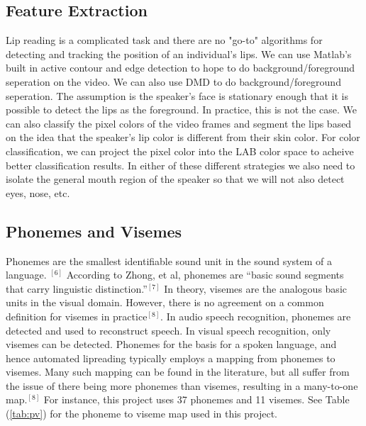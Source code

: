 \documentclass[a4paper]{article}
\begin{document}
\subsection{Feature Extraction}
Lip reading is a complicated task and there are no "go-to" algorithms for detecting and tracking the position of an individual's lips. We can use Matlab's built in active contour and edge detection to hope to do background/foreground seperation on the video. We can also use DMD to do background/foreground seperation. The assumption is the speaker's face is stationary enough that it is possible to detect the lips as the foreground. In practice, this is not the case. We can also classify the pixel colors of the video frames and segment the lips based on the idea that the speaker's lip color is different from their skin color. For color classification, we can project the pixel color into the LAB color space to acheive better classification results. In either of these different strategies we also need to isolate the general mouth region of the speaker so that we will not also detect eyes, nose, etc.
\subsection{Phonemes and Visemes}
Phonemes are the smallest identifiable sound unit in the sound system of a language. $^{[6]}$  According to Zhong, et al, phonemes are ``basic sound segments that carry linguistic distinction.''$^{[7]}$ In theory, visemes are the analogous basic units in the visual domain.  However, there is no agreement on a common definition for visemes in practice$^{[8]}$.  In audio speech recognition, phonemes are detected and used to reconstruct speech.  In visual speech recognition, only visemes can be detected.  Phonemes for the basis for a spoken language, and hence automated lipreading typically employs a mapping from phonemes to visemes.  Many such mapping can be found in the literature, but all suffer from the issue of there being more phonemes than visemes, resulting in a many-to-one map.$^{[8]}$  For instance, this project uses 37 phonemes and 11 visemes. See Table (\ref{tab:pv}) for the phoneme to viseme map used in this project.  
\end{document}
